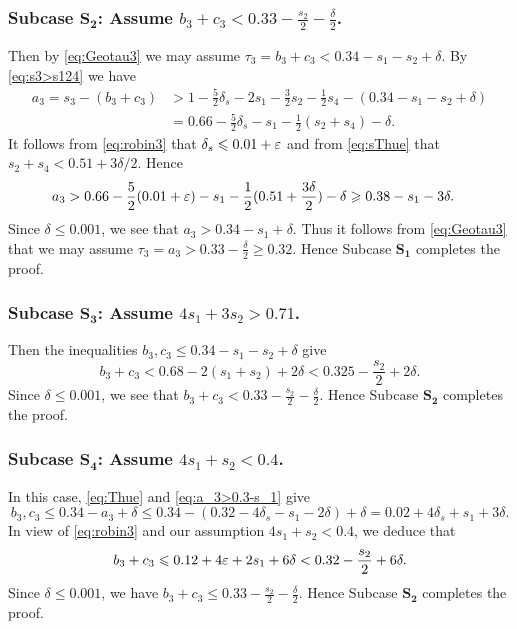 \subsubsection*{Subcase $\mathbf{S_2}$: Assume
$b_3+c_3<0.33-\frac{s_2}{2}-\frac{\delta}{2}$.}

Then by \eqref{eq:Geotau3} we may assume $\tau_3=b_3+c_3<0.34-s_1-s_2+\delta$. By \eqref{eq:s3>s124} we have
\begin{align*}
a_3 = s_3 - (b_3+c_3) &> 1 - \frac{5}{2}\delta_s - 2s_1 - \frac{3}{2}s_2 - \frac{1}{2}s_4 - (0.34-s_1-s_2+ \delta)\\
& = 0.66- \frac{5}{2}\delta_s - s_1 - \frac{1}{2}(s_2+s_4)-\delta.
\end{align*}
It follows from \eqref{eq:robin3} that $\delta_s\leqslant 0.01+\varepsilon$ and from
 \eqref{eq:sThue} that $s_2+s_4<0.51+3\delta/2$. Hence
 \begin{align*}
a_3
& > 0.66- \frac{5}{2}(0.01+\varepsilon) - s_1 - \frac{1}{2}(0.51+\frac{3\delta}{2}) - \delta \geqslant 0.38-s_1- 3\delta.
\end{align*}
Since $\delta\le 0.001$, we see that $a_3> 0.34-s_1+ \delta$.
Thus it follows from \eqref{eq:Geotau3} that we may assume  $\tau_3=a_3>0.33-\frac{\delta}{2}\geq 0.32$. Hence Subcase
$\mathbf{S_1}$ completes the proof.



\subsubsection*{Subcase $\mathbf{S_3}$: Assume $4s_1+3s_2>0.71$.}

Then the inequalities $b_3,c_3 \le 0.34-s_1-s_2+ \delta$ give
$$
b_3+c_3<0.68-2(s_1+s_2)+2\delta<
0.325 -\frac{s_2}{2}+2\delta.
$$
Since $\delta\leq 0.001$, we see that $b_3+c_3<0.33-\frac{s_2}{2}-\frac{\delta}{2}$. Hence Subcase $\mathbf{S_2}$ completes the proof.


\subsubsection*{Subcase $\mathbf{S_4}$: Assume $4s_1+s_2<0.4$.}


In this case, \eqref{eq:Thue} and \eqref{eq:a_3>0.3-s_1} give
$$
b_3,c_3 \le 0.34-a_3+\delta \le 0.34 - (0.32-4\delta_s-s_1-2\delta) +\delta= 0.02+4\delta_s+s_1+3\delta.
$$
In view of \eqref{eq:robin3} and
our assumption $4s_1+s_2<0.4$, we deduce that
\begin{align*}
b_3+c_3 \leqslant 0.12+4\varepsilon + 2s_1+6\delta <
0.32-\frac{s_2}{2}+6\delta.
\end{align*}
Since $\delta\leq 0.001$, we have $b_3+c_3 \le 0.33-\frac{s_2}{2}-\frac{\delta}{2}$. Hence
Subcase $\mathbf{S_2}$ completes the proof.



